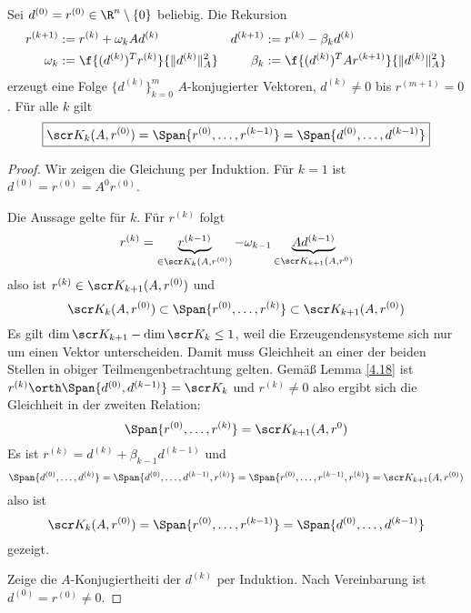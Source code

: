 \documentclass[11pt]{scrartcl}
\begin{document}
\begin{st} \label{4.20}
	Sei $d^{(0)} = r^{(0)} \in \R^n \setminus \{0\}$ beliebig.
	Die Rekursion
	\begin{align*}
		r^{(k+1)} &:= r^{(k)} + \omega_k Ad^{(k)}
		& d^{(k+1)} &:= r^{(k)} - \beta_k d^{(k)} \\
		\omega_k &:= \f {(d^{(k)})^T r^{(k)}}{\|d^{(k)}\|_A^2}
		& \beta_k &:= \f{(d^{(k)})^T Ar^{(k+1)}}{\|d^{(k)}\|_A^2}
	\end{align*}
	erzeugt eine Folge $\{d^{(k)}\}_{k=0}^m$ $A$-konjugierter Vektoren, $d^{(k)} \neq 0$ bis $r^{(m+1)} = 0$.
	Für alle $k$ gilt
	\[
		\boxed{
			\scr K_k(A, r^{(0)}) = \Span\{r^{(0)}, \dotsc, r^{(k-1)}\} = \Span \{d^{(0)}, \dotsc, d^{(k-1)} \}
		}
	\]
	\begin{proof}
		Wir zeigen die Gleichung per Induktion.
		Für $k=1$ ist $d^{(0)} = r^{(0)} = A^0r^{(0)}$.

		Die Aussage gelte für $k$. Für $r^{(k)}$ folgt
		\[
			r^{(k)} = \underbrace{r^{(k-1)}}_{\in \scr K_k(A, r^{(0)})} - \omega_{k-1} \underbrace{A d^{(k-1)}}_{\in \scr K_{k+1}(A, r^{0})}
		\]
		also ist $r^{(k)} \in \scr K_{k+1}(A, r^{(0)})$ und
		\[
			\scr K_k(A, r^{(0)}) \subset \Span\{r^{(0)}, \dotsc, r^{(k)}\} \subset \scr K_{k+1}(A, r^{(0)})
		\]
		Es gilt $\dim \scr K_{k+1} - \dim \scr K_k \le 1$, weil die Erzeugendensysteme sich nur um einen Vektor unterscheiden.
		Damit muss Gleichheit an einer der beiden Stellen in obiger Teilmengenbetrachtung gelten.
		Gemäß Lemma \ref{4.18} ist $r^{(k)} \orth \Span\{d^{(0)}, d^{(k-1)}\} = \scr K_k$ und $r^{(k)} \neq 0$ also ergibt sich die Gleichheit in der zweiten Relation:
		\[
			\Span\{r^{(0)}, \dotsc, r^{(k)}\} = \scr K_{k+1} (A,r^{0})
		\]
		Es ist $r^{(k)} = d^{(k)} + \beta_{k-1} d^{(k-1)}$ und 
		\[
			\Span\{d^{(0)}, \dotsc, d^{(k)}\} 
			= \Span\{d^{(0)}, \dotsc, d^{(k-1)}, r^{(k)}\} 
			= \Span\{r^{(0)}, \dotsc, r^{(k-1)}, r^{(k)}\}
			= \scr K_{k+1} (A, r^{(0)})
		\]
		also ist 
		\[
			\scr K_k(A, r^{(0)}) = \Span\{r^{(0)}, \dotsc, r^{(k-1)}\} = \Span \{d^{(0)}, \dotsc, d^{(k-1)} \}
		\]
		gezeigt.

		Zeige die $A$-Konjugiertheiti der $d^{(k)}$ per Induktion.
		Nach Vereinbarung ist $d^{(0)} = r^{(0)} \neq 0$.


\end{proof}
\end{st}
\end{document}
